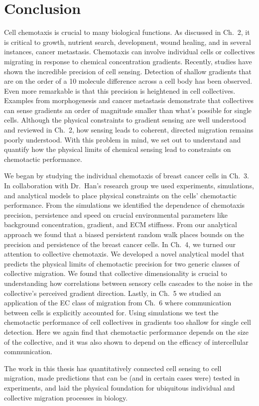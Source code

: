 
\chapter{Conclusion}

\noindent
Cell chemotaxis is crucial to many biological functions. As discussed in Ch.\ 2, it is critical to growth, nutrient search, development, wound healing, and in several instances, cancer metastasis. Chemotaxis can involve individual cells or collectives migrating in response to chemical concentration gradients. Recently, studies have shown the incredible precision of cell sensing. Detection of shallow gradients that are on the order of a 10 molecule difference across a cell body has been observed. Even more remarkable is that this precision is heightened in cell collectives. Examples from morphogenesis and cancer metastasis demonstrate that collectives can sense gradients an order of magnitude smaller than what's possible for single cells. Although the physical constraints to gradient sensing are well understood and reviewed in Ch.\ 2, how sensing leads to coherent, directed migration remains poorly understood. With this problem in mind, we set out to understand and quantify how the physical limits of chemical sensing lead to constraints on chemotactic performance.

We began by studying the individual chemotaxis of breast cancer cells in Ch.\ 3. In collaboration with Dr.\ Han's research group we used experiments, simulations, and analytical models to place physical constraints on the cells' chemotactic performance. From the simulations we identified the dependence of chemotaxis precision, persistence and speed on crucial environmental parameters like background concentration, gradient, and ECM stiffness. From our analytical approach we found that a biased persistent random walk places bounds on the precision and persistence of the breast cancer cells. In Ch.\ 4, we turned our attention to collective chemotaxis. We developed a novel analytical model that predicts the physical limits of chemotactic precision for two generic classes of collective migration. We found that collective dimensionality is crucial to understanding how correlations between sensory cells cascades to the noise in the collective's perceived gradient direction. Lastly, in Ch.\ 5 we studied an application of the EC class of migration from Ch.\ 6 where communication between cells is explicitly accounted for. Using simulations we test the chemotactic performance of cell collectives in gradients too shallow for single cell detection. Here we again find that chemotactic performance depends on the size of the collective, and it was also shown to depend on the efficacy of intercellular communication.

The work in this thesis has quantitatively connected cell sensing to cell migration, made predictions that can be (and in certain cases were) tested in experiments, and laid the physical foundation for ubiquitous individual and collective migration processes in biology.
